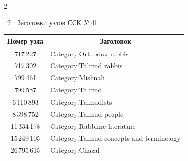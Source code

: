\begin{multicols}{2}
\vspace*{6pt}





  \begin{center}  %


{\tablename~2}\ \ \small{Заголовки узлов ССК №\,41}



\vspace*{6pt}



{\small   

\tabcolsep=3.5pt

\begin{tabular}{|c|l|}

   \hline

Номер узла&\multicolumn{1}{c|}{Заголовок}\\

\hline

717\,227&Category:Orthodox rabbis\\

717\,302&Category:Talmud rabbis\\

799\,461&Category:Mishnah\\

799\,587&Category:Talmud\\

6\,110\,893\hphantom{\,9}&Category:Talmudists\\

8\,398\,752\hphantom{\,9}&Category:Talmud people\\

11\,334\,178\hphantom{\,99}&Category:Rabbinic literature\\

15\,249\,105\hphantom{\,99}&Category:Talmud concepts and terminology\\

26\,795\,615\hphantom{\,99}&Category:Chazal\\

\hline

\end{tabular}

}

\end{center}



\vspace*{3pt}




\end{multicols}
